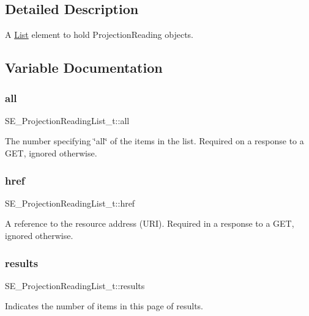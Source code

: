 \subsection{Detailed Description}
A \hyperlink{structList}{List} element to hold Projection\+Reading objects. 

\subsection{Variable Documentation}
\mbox{\label{group__ProjectionReadingList_ga6eac100bf5814c2361a25d6ea3f5963f}} 
\subsubsection{\texorpdfstring{all}{all}}
{\footnotesize\ttfamily S\+E\+\_\+\+Projection\+Reading\+List\+\_\+t\+::all}

The number specifying \char`\"{}all\char`\"{} of the items in the list. Required on a response to a G\+ET, ignored otherwise. \mbox{\label{group__ProjectionReadingList_gafbb9141bdf291e914094086570ba7eba}} 
\subsubsection{\texorpdfstring{href}{href}}
{\footnotesize\ttfamily S\+E\+\_\+\+Projection\+Reading\+List\+\_\+t\+::href}

A reference to the resource address (U\+RI). Required in a response to a G\+ET, ignored otherwise. \mbox{\label{group__ProjectionReadingList_gaadc1fb88b20c64295f8edbd46da6d3ef}} 
\subsubsection{\texorpdfstring{results}{results}}
{\footnotesize\ttfamily S\+E\+\_\+\+Projection\+Reading\+List\+\_\+t\+::results}

Indicates the number of items in this page of results. 